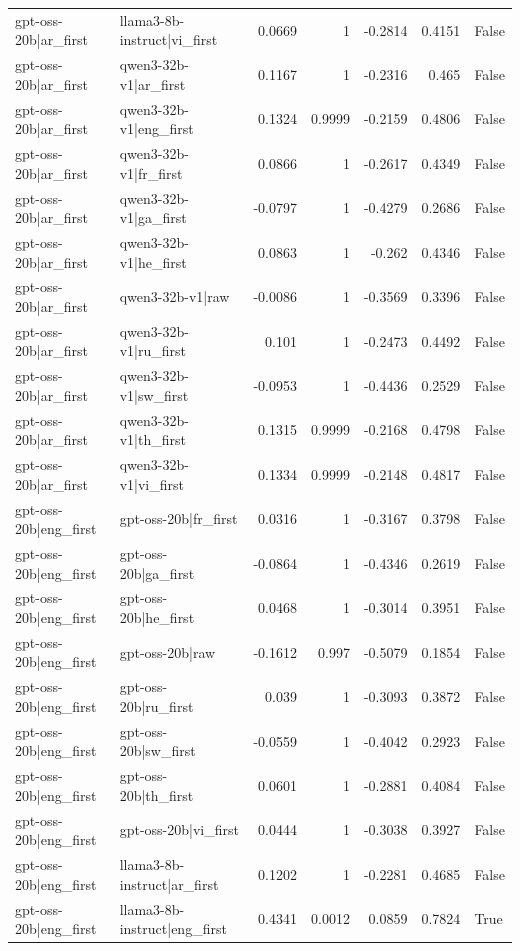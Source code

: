 \begin{table}
\begin{tabular}{l l r r r r l}
gpt-oss-20b|ar_first & llama3-8b-instruct|vi_first & 0.0669 & 1 & -0.2814 & 0.4151 & False \\
gpt-oss-20b|ar_first & qwen3-32b-v1|ar_first & 0.1167 & 1 & -0.2316 & 0.465 & False \\
gpt-oss-20b|ar_first & qwen3-32b-v1|eng_first & 0.1324 & 0.9999 & -0.2159 & 0.4806 & False \\
gpt-oss-20b|ar_first & qwen3-32b-v1|fr_first & 0.0866 & 1 & -0.2617 & 0.4349 & False \\
gpt-oss-20b|ar_first & qwen3-32b-v1|ga_first & -0.0797 & 1 & -0.4279 & 0.2686 & False \\
gpt-oss-20b|ar_first & qwen3-32b-v1|he_first & 0.0863 & 1 & -0.262 & 0.4346 & False \\
gpt-oss-20b|ar_first & qwen3-32b-v1|raw & -0.0086 & 1 & -0.3569 & 0.3396 & False \\
gpt-oss-20b|ar_first & qwen3-32b-v1|ru_first & 0.101 & 1 & -0.2473 & 0.4492 & False \\
gpt-oss-20b|ar_first & qwen3-32b-v1|sw_first & -0.0953 & 1 & -0.4436 & 0.2529 & False \\
gpt-oss-20b|ar_first & qwen3-32b-v1|th_first & 0.1315 & 0.9999 & -0.2168 & 0.4798 & False \\
gpt-oss-20b|ar_first & qwen3-32b-v1|vi_first & 0.1334 & 0.9999 & -0.2148 & 0.4817 & False \\
gpt-oss-20b|eng_first & gpt-oss-20b|fr_first & 0.0316 & 1 & -0.3167 & 0.3798 & False \\
gpt-oss-20b|eng_first & gpt-oss-20b|ga_first & -0.0864 & 1 & -0.4346 & 0.2619 & False \\
gpt-oss-20b|eng_first & gpt-oss-20b|he_first & 0.0468 & 1 & -0.3014 & 0.3951 & False \\
gpt-oss-20b|eng_first & gpt-oss-20b|raw & -0.1612 & 0.997 & -0.5079 & 0.1854 & False \\
gpt-oss-20b|eng_first & gpt-oss-20b|ru_first & 0.039 & 1 & -0.3093 & 0.3872 & False \\
gpt-oss-20b|eng_first & gpt-oss-20b|sw_first & -0.0559 & 1 & -0.4042 & 0.2923 & False \\
gpt-oss-20b|eng_first & gpt-oss-20b|th_first & 0.0601 & 1 & -0.2881 & 0.4084 & False \\
gpt-oss-20b|eng_first & gpt-oss-20b|vi_first & 0.0444 & 1 & -0.3038 & 0.3927 & False \\
gpt-oss-20b|eng_first & llama3-8b-instruct|ar_first & 0.1202 & 1 & -0.2281 & 0.4685 & False \\
gpt-oss-20b|eng_first & llama3-8b-instruct|eng_first & 0.4341 & 0.0012 & 0.0859 & 0.7824 & True \\

\end{tabular}
\end{table}
